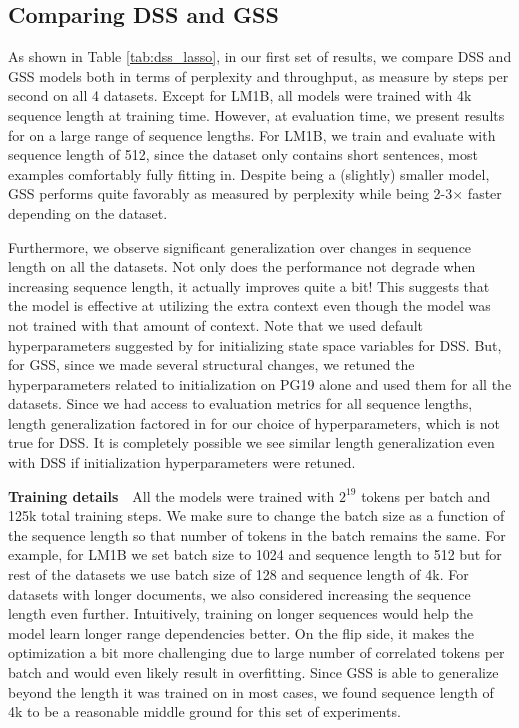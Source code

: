 \subsection{Comparing DSS and GSS}
\label{subsec:lasso_dss}

As shown in Table \ref{tab:dss_lasso}, in our first set of results, we compare DSS and GSS models both in terms of perplexity and throughput, as measure by steps per second on all 4 datasets. Except for LM1B, all models were trained with 4k sequence length at training time. However, at evaluation time, we present results for on a large range of sequence lengths. For LM1B, we train and evaluate with sequence length of 512, since the dataset only contains short sentences, most examples comfortably fully fitting in. Despite being a (slightly) smaller model, GSS performs quite favorably as measured by perplexity while being 2-3$\times$ faster depending on the dataset. 

Furthermore, we observe significant generalization over changes in sequence length on all the datasets. Not only does the performance not degrade when increasing sequence length, it actually improves quite a bit! This suggests that the model is effective at utilizing the extra context even though the model was not trained with that amount of context. Note that we used default hyperparameters suggested by \cite{dss_gupta2022diagonal} for initializing state space variables for DSS. But, for GSS, since we made several structural changes, we retuned the hyperparameters related to initialization on PG19 alone and used them for all the datasets. Since we had access to evaluation metrics for all sequence lengths, length generalization factored in for our choice of hyperparameters, which is not true for DSS. It is completely possible we see similar length generalization even with DSS if initialization hyperparameters were retuned.

\textbf{Training details}\ \ All the models were trained with $2^{19}$ tokens per batch and 125k total training steps. We make sure to change the batch size as a function of the sequence length so that number of tokens in the batch remains the same. For example, for LM1B we set batch size to 1024 and sequence length to 512 but for rest of the datasets we use batch size of 128 and sequence length of 4k. For datasets with longer documents, we also considered increasing the sequence length even further. Intuitively, training on longer sequences would help the model learn longer range dependencies better. On the flip side, it makes the optimization a bit more challenging due to large number of correlated tokens per batch and would even likely result in overfitting. Since GSS is able to generalize beyond the length it was trained on in most cases, we found sequence length of 4k to be a reasonable middle ground for this set of experiments.

